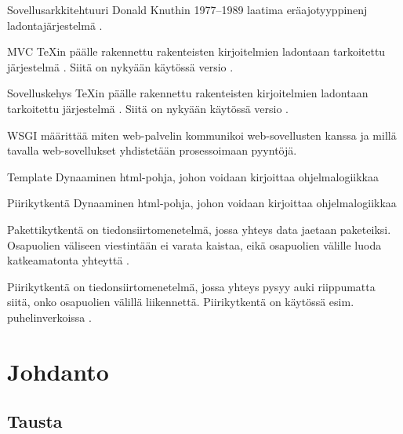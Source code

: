 \documentclass[utf8]{gradu3}
\begin{document}
\begin{thetermlist}
\item[Sovellusarkkitehtuuri] Donald Knuthin 1977--1989 laatima eräajotyyppinenj
  ladontajärjestelmä \parencite[ks.][]{knuth86:_texbook}. 
\item[MVC] \TeX in \parencite[ks.][]{knuth86:_texbook} päälle
  rakennettu rakenteisten kirjoitelmien ladontaan tarkoitettu
  järjestelmä \parencite[ks.][]{lamport94:_latex}.  Siitä on nykyään
  käytössä versio \LaTeXe.
\item[Sovelluskehys] \TeX in \parencite[ks.][]{knuth86:_texbook} päälle
  rakennettu rakenteisten kirjoitelmien ladontaan tarkoitettu
  järjestelmä \parencite[ks.][]{lamport94:_latex}.  Siitä on nykyään
  käytössä versio \LaTeXe.
\item[WSGI] määrittää miten web-palvelin kommunikoi web-sovellusten kanssa ja millä tavalla web-sovellukset
yhdistetään prosessoimaan pyyntöjä.
\item[Template] Dynaaminen html-pohja, johon voidaan kirjoittaa ohjelmalogiikkaa
\item[Piirikytkentä] Dynaaminen html-pohja, johon voidaan kirjoittaa ohjelmalogiikkaa
\item[Pakettikytkentä] on tiedonsiirtomenetelmä, jossa yhteys data jaetaan paketeiksi. Osapuolien väliseen viestintään ei varata kaistaa, eikä osapuolien välille luoda katkeamatonta yhteyttä \parencite{ikytkenta}.
\item[Piirikytkentä] on tiedonsiirtomenetelmä, jossa yhteys pysyy auki riippumatta siitä, onko osapuolien välillä liikennettä. Piirikytkentä on käytössä esim. puhelinverkoissa \parencite{kytkenta}.
\end{thetermlist}

\mainmatter

\chapter{Johdanto}

\section{Tausta}
\end{document}
